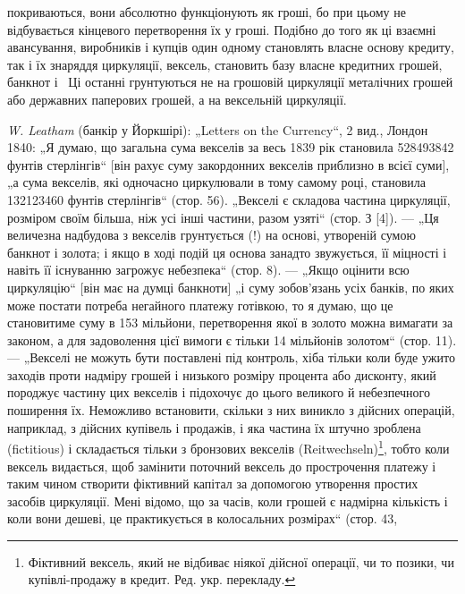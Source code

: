 \parcont{}  %
покриваються, вони абсолютно функціонують як гроші, бо при
цьому не відбувається кінцевого перетворення їх у гроші. Подібно
до того як ці взаємні авансування, виробників і купців
один одному становлять власне основу кредиту, так і їх знаряддя
циркуляції, вексель, становить базу власне кредитних
грошей, банкнот і~ Ці останні грунтуються не на грошовій
циркуляції металічних грошей або державних паперових грошей,
а на вексельній циркуляції.

\begin{small}
\noindent{}\emph{W. Leatham} (банкір у Йоркшірі): „Letters on the Currency“, 2 вид., Лондон 1840:
„Я думаю, що загальна сума векселів за весь 1839 рік становила 528493842 фунтів
стерлінгів“ [він рахує суму закордонних векселів приблизно в  всієї суми],
„а сума векселів, які одночасно циркулювали в тому самому році, становила
132123460 фунтів стерлінгів“ (стор. 56). „Векселі є складова частина циркуляції,
розміром своїм більша, ніж усі інші частини, разом узяті“ (стор. З [4]). — „Ця
величезна надбудова з векселів грунтується (!) на основі, утвореній сумою
банкнот і золота; і якщо в ході подій ця основа занадто звужується, її міцності
і навіть її існуванню загрожує небезпека“ (стор. 8). — „Якщо оцінити всю
циркуляцію“ [він має на думці банкноти] „і суму зобов’язань усіх банків,
по яких може постати потреба негайного платежу готівкою, то я думаю, що
це становитиме суму в 153 мільйони, перетворення якої в золото можна вимагати
за законом, а для задоволення цієї вимоги є тільки 14 мільйонів золотом“
(стор. 11). — „Векселі не можуть бути поставлені під контроль, хіба тільки
коли буде ужито заходів проти надміру грошей і низького розміру процента
або дисконту, який породжує частину цих векселів і підохочує до цього великого
й небезпечного поширення їх. Неможливо встановити, скільки з них виникло
з дійсних операцій, наприклад, з дійсних купівель і продажів, і яка частина їх
штучно зроблена (fictitious) і складається тільки з бронзових векселів (Reitwechseln)\footnote*{
Фіктивний вексель, який не відбиває ніякої дійсної операції, чи то позики,
чи купівлі-продажу в кредит. Ред. укр. перекладу.
}, тобто коли
вексель видається, щоб замінити поточний вексель до прострочення платежу і таким чином створити
фіктивний капітал за допомогою утворення простих засобів циркуляції. Мені відомо, що за часів, коли
грошей є надмірна кількість і коли вони дешеві, це практикується в колосальних розмірах“ (стор. 43,

\end{small}
